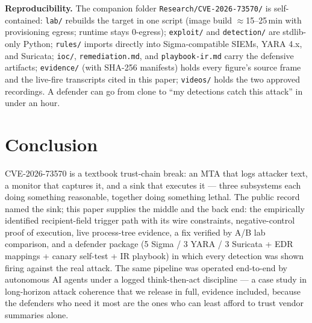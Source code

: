\textbf{Reproducibility.} The companion folder
\texttt{Research/CVE-2026-73570/} is self-contained: \texttt{lab/}
rebuilds the target in one script (image build $\approx$15--25\,min with
provisioning egress; runtime stays 0-egress); \texttt{exploit/} and
\texttt{detection/} are stdlib-only Python; \texttt{rules/} imports
directly into Sigma-compatible SIEMs, YARA 4.x, and Suricata;
\texttt{ioc/}, \texttt{remediation.md}, and \texttt{playbook-ir.md} carry
the defensive artifacts; \texttt{evidence/} (with SHA-256 manifests) holds
every figure's source frame and the live-fire transcripts cited in this
paper; \texttt{videos/} holds the two approved recordings. A defender can
go from clone to ``my detections catch this attack'' in under an hour.

\section{Conclusion}
\label{sec:conclusion}

CVE-2026-73570 is a textbook trust-chain break: an MTA that logs attacker
text, a monitor that captures it, and a sink that executes it — three
subsystems each doing something reasonable, together doing something
lethal. The public record named the sink; this paper supplies the middle
and the back end: the empirically identified recipient-field trigger path
with its wire constraints, negative-control proof of execution, live
process-tree evidence, a fix verified by A/B lab comparison, and a
defender package (5 Sigma / 3 YARA / 3 Suricata + EDR mappings + canary
self-test + IR playbook) in which every detection was shown firing against
the real attack. The same pipeline was operated end-to-end by autonomous AI
agents under a logged think-then-act discipline — a case study in
long-horizon attack coherence that we release in full, evidence included,
because the defenders who need it most are the ones who can least afford
to trust vendor summaries alone.

